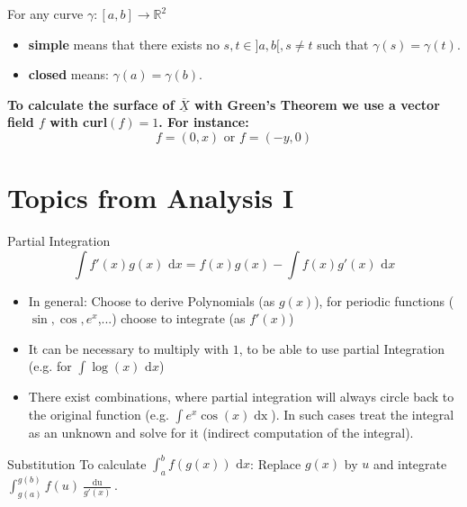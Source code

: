 \documentclass[a4paper,fontsize = 8pt]{scrartcl}
\def\R{\mathbb{R}}
\def\X{\underline{\overline{X}}}
\def\dx{\text{ d}x}
\begin{document}
For any curve $\gamma: [a,b] \to \R^2$ 
\begin{itemize}
  \item \textbf{simple} means that there exists no $s, t \in ]a,b[, s \neq t$ such that $\gamma(s) = \gamma(t)$. 
  \item \textbf{closed} means: $\gamma(a) = \gamma(b)$.
\end{itemize}
\textbf{To calculate the surface of $\X$ with Green's Theorem we use a vector field $f$ with curl$(f) = 1$. For instance: \[f = (0,x) \text{ or } f = (-y, 0)\]}

\section{Topics from Analysis I}
\begin{mainbox}{Partial Integration}
 $$\int f'(x) g(x) \dx = f(x)g(x) - \int f(x) g'(x) \dx$$
\end{mainbox}
\begin{itemize}
 \item In general: Choose to derive Polynomials (as $g(x)$), for periodic functions ($\sin, \cos, e^x$,...) choose to integrate (as $f'(x)$)
 \item It can be necessary to multiply with $1$, to be able to use partial Integration (e.g. for $\int \log(x) \dx$) 
 \item There exist combinations, where partial integration will always circle back to the original function (e.g. $\int e^x \cos(x)\mathop{dx}$). In such cases treat the integral as an unknown and solve for it (indirect computation of the integral).
\end{itemize}
\begin{mainbox}{Substitution}
 To calculate $\int_a^b f(g(x)) \dx$: Replace $g(x)$ by $u$ and integrate $\int_{g(a)}^{g(b)} f(u) \frac{\mathop{du}}{g'(x)}$.
\end{mainbox}
\end{document}
